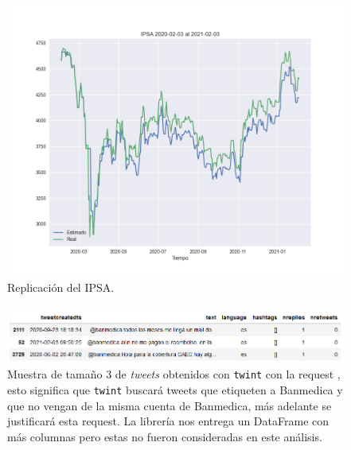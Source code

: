 \documentclass{article}
\begin{document}
\begin{figure}[H]
	\centering
	\includegraphics[scale=.5]{imgs/ipsa_replication.png}
	\caption{Replicación del IPSA.}
	\label{fig:ipsa_replication}
\end{figure}
\begin{figure}[H]
	\centering
	\includegraphics[scale=.65]{imgs/twint_example.png}
	\caption{Muestra de tamaño $3$ de \textit{tweets} obtenidos con \texttt{twint} con la request , esto significa que \texttt{twint} buscará tweets que etiqueten a Banmedica y que no vengan de la misma cuenta de Banmedica, más adelante se justificará esta request. La librería nos entrega un DataFrame con más columnas pero estas no fueron consideradas en este análisis.}
	\label{fig:twint_example}
\end{figure}
\end{document}
